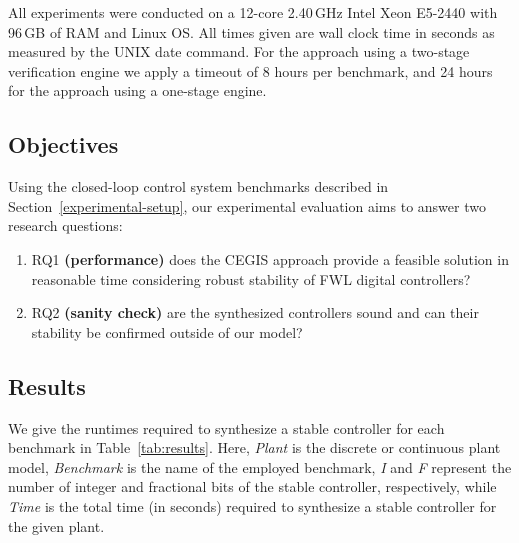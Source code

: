 \documentclass{sig-alternate-05-2015}
\begin{document}
All experiments were conducted on a 12-core 2.40\,GHz Intel Xeon E5-2440
with 96\,GB of RAM and Linux OS.  All times given are wall clock time in
seconds as measured by the UNIX date command.  For the approach using a
two-stage verification engine we apply a timeout of 8 hours per benchmark,
and 24 hours for the approach using a one-stage engine.

\subsection{Objectives}
\label{experimental-objectives}

Using the closed-loop control system benchmarks described in
Section~\ref{experimental-setup}, our experimental evaluation aims to answer
two research questions:
%
\begin{enumerate}

\item RQ1 \textbf{(performance)} does the CEGIS approach provide a feasible
solution in reasonable time considering robust stability of FWL digital
controllers?

\item RQ2 \textbf{(sanity check)} are the synthesized controllers sound
and can their stability be confirmed outside of our model?

\end{enumerate}

\subsection{Results}
\label{experimental-results}

We give the runtimes required to synthesize a stable controller for each
benchmark in Table~\ref{tab:results}.  Here, \textit{Plant} is the discrete
or continuous plant model, \textit{Benchmark} is the name of the employed
benchmark, \textit{I} and \textit{F} represent the number of integer and
fractional bits of the stable controller, respectively, while \textit{Time}
is the total time (in seconds) required to synthesize a stable controller
for the given plant.
\end{document}
